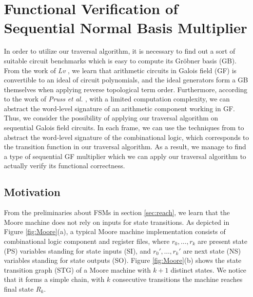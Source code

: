 \chapter{Functional Verification of Sequential Normal Basis Multiplier}
\label{ch:normal}
In order to utilize our traversal algorithm, it is necessary to find out
a sort of suitable circuit benchmarks which is easy to compute its
Gr\"obner basis (GB). From the work of {\it Lv} \cite{lv:phd},
we learn that arithmetic circuits in Galois field (GF) is
convertible to an ideal of circuit polynomials, and the 
ideal generators form a GB themselves when applying reverse topological
term order. Furthermore, according to the work of {\it Pruss et al.}
\cite{pruss:tcad15}, with a limited computation complexity,
we can abstract the word-level signature of an arithmetic 
component working in GF. Thus, we consider the possibility 
of applying our traversal algorithm on sequential Galois
field circuits. In each frame, we can use the techniques 
from \cite{pruss:tcad15} to abstract the word-level
signature of the combinational logic, which corresponds
to the transition function in our traversal algorithm.
As a result, we manage to find a type of sequential GF multiplier
which we can apply our traversal algorithm to actually 
verify its functional correctness.

\section{Motivation}
\label{sec:normal_motiv}
From the preliminaries about FSMs in section \ref{sec:reach}, we learn that the
Moore machine does not rely on inputs for state transitions. 
As depicted in Figure \ref{fig:Moore}(a), a typical Moore machine implementation
consists of combinational logic component and register files, where
$r_0,\dots,r_k$ are present state (PS) variables 
standing for state inputs (SI), and $r_0',\dots,r_k'$ are next state (NS) variables standing for
state outputs (SO). Figure \ref{fig:Moore}(b) shows the state transition graph (STG) of 
a Moore machine with $k+1$ distinct states. We notice that it forms a simple chain,
with $k$ consecutive transitions the machine reaches final state $R_k$.

\begin{figure}[H]
\end{figure}

